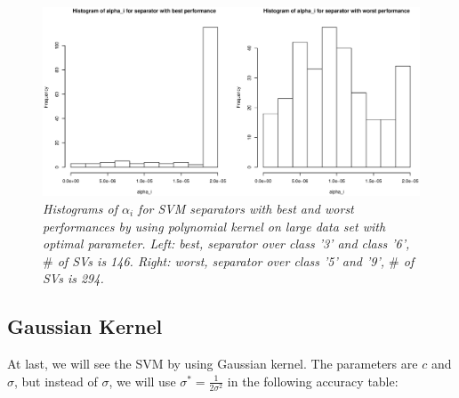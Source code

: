 \documentclass{article}
\begin{document}
\begin{figure}[htp]
\centering
\includegraphics[width=12.1cm]{large_hist_polynomial.eps}
\caption{\textit{Histograms of $\alpha_{i}$ for SVM separators with best and worst performances by using polynomial kernel on large data set with optimal parameter. Left: best, separator over class '3' and class '6', $\#$ of SVs is 146. Right: worst, separator over class '5' and '9', $\#$ of SVs is 294.}}
\end{figure}

\goodbreak

\subsection{Gaussian Kernel}

At last, we will see the SVM by using Gaussian kernel. The parameters are $c$ and $\sigma$, but instead of $\sigma$, we will use $\sigma^{*} = \frac{1}{2\sigma^{2}}$ in the following accuracy table:
\end{document}
